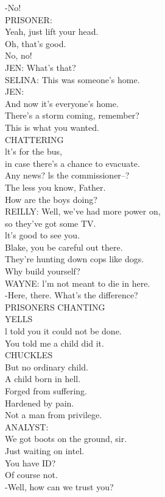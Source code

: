 \documentclass{article}
\begin{document}
\begin{multicols}{3}
-No!\\
PRISONER:\\
Yeah, just lift your head.\\
Oh, that's good.\\
No, no!\\
JEN: What's that?\\
SELINA: This was someone's home.\\
JEN:\\
And now it's everyone's home.\\
There's a storm coming, remember?\\
This is what you wanted.\\
CHATTERING\\
lt's for the bus,\\
in case there's a chance to evacuate.\\
Any news? ls the commissioner--?\\
The less you know, Father.\\
How are the boys doing?\\
REILLY: Well, we've had more power on,\\
so they've got some TV.\\
lt's good to see you.\\
Blake, you be careful out there.\\
They're hunting down cops like dogs.\\
Why build yourself?\\
WAYNE: l'm not meant to die in here.\\
-Here, there. What's the difference?\\
PRISONERS CHANTING\\
YELLS\\
l told you it could not be done.\\
You told me a child did it.\\
CHUCKLES\\
But no ordinary child.\\
A child born in hell.\\
Forged from suffering.\\
Hardened by pain.\\
Not a man from privilege.\\
ANALYST:\\
We got boots on the ground, sir.\\
Just waiting on intel.\\
You have ID?\\
Of course not.\\
-Well, how can we trust you?\\

\end{multicols}
\end{document}

